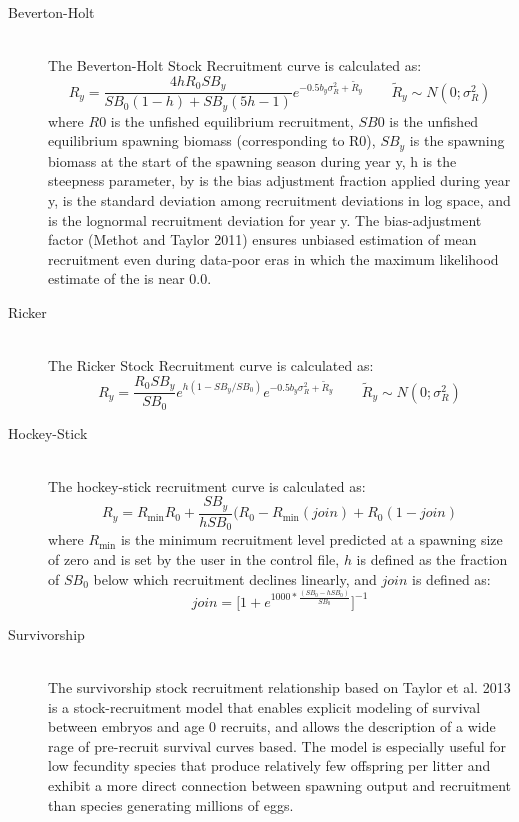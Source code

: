 \begin{description}
	\item[Beverton-Holt]\hfil\\
	The Beverton-Holt Stock Recruitment curve is calculated as:
	\begin{equation}{R_y = \frac{4hR_0SB_y}{SB_0(1-h)+SB_y(5h-1)}e^{-0.5b_y\sigma^2_R+\tilde{R}_y}\qquad  \tilde{R}_y\sim N(0;\sigma^2_R)}
	\end{equation}
	where $R0$ is the unfished equilibrium recruitment, $SB0$ is the unfished equilibrium spawning biomass (corresponding to R0), $SB_y$ is the spawning biomass at the start of the spawning season during year y, h is the steepness parameter, by is the bias adjustment fraction applied during year y,   is the standard deviation among recruitment deviations in log space, and   is the lognormal recruitment deviation for year y.  The bias-adjustment factor (Methot and Taylor 2011) ensures unbiased estimation of mean recruitment even during data-poor eras in which the maximum likelihood estimate of the   is near 0.0.

	\item[Ricker]\hfil\\
	The Ricker Stock Recruitment curve is calculated as:
	\begin{equation}{R_y = \frac{R_0SB_y}{SB_0}e^{h(1-SB_y/SB_0)}e^{-0.5b_y\sigma^2_R+\tilde{R}_y}\qquad  \tilde{R}_y\sim N(0;\sigma^2_R)}
	\end{equation}

	\hypertarget{Hockey}{}
	\item[Hockey-Stick]\hfil\\
	The hockey-stick recruitment curve is calculated as:
	\begin{equation}{R_y = R_{\text{min}}R_0+\frac{SB_y}{hSB_0}(R_0-R_{\text{min}}(join)+R_0(1-join) }\end{equation}
	where $R_{\text{min}}$ is the minimum recruitment level predicted at a spawning size of zero and is set by the user in the control file, $h$ is defined as the fraction of $SB_0$ below which recruitment declines linearly, and $join$ is defined as:
	\begin{equation}{ join = \bigg[1+e^{1000*\frac{(SB_0-hSB_0)}{SB_0}}\bigg]^{-1} } \end{equation}

	\hypertarget{Survivorship}{}
	\item[Survivorship]\hfill\\
	The survivorship stock recruitment relationship based on Taylor et al. 2013 is a stock-recruitment model that enables explicit modeling of survival between embryos and age 0 recruits, and allows the description of a wide rage of pre-recruit survival curves based.  The model is especially useful for low fecundity species that produce relatively few offspring per litter and exhibit a more direct connection between spawning output and recruitment than species generating millions of eggs.
	\\
	

\end{description}
